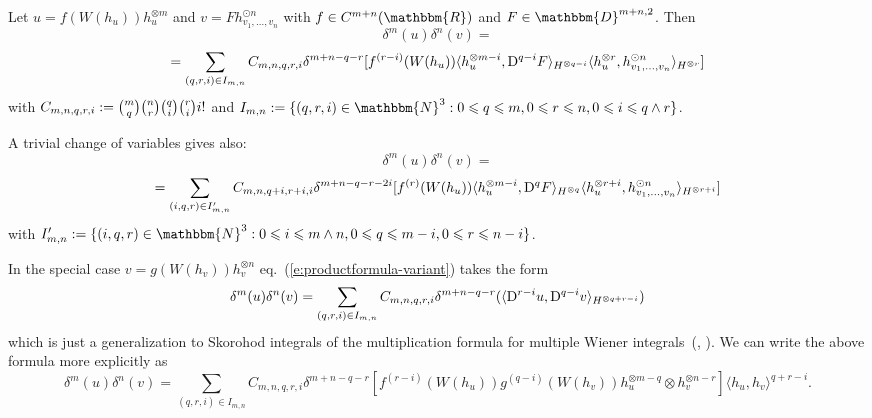 \begin{appendices}
\begin{lemma}
  Let $u = f (W (h_u)) h^{\otimes m}_u$ and $v = Fh^{\odot n}_{v_1, \ldots,
  v_n}$ with $f \in C^{m + n} (\mathbbm{R})$ and $F \in \mathbbm{D}^{m + n,
  2}$. Then
  \[ \delta^m (u) \delta^n (v) = \]
  \begin{equation}
    = \sum_{(q, r, i) \in I_{m, n}} C_{m, n, q, r, i} \delta^{m + n - q - r}
    [f^{(r - i)} (W (h_u)) \langle h_u^{\otimes m - i}, \mathrm{D}^{q - i} F
    \rangle_{H^{\otimes q - i}} \langle h^{\otimes r}_u, h^{\odot n}_{v_1,
    \ldots, v_n} \rangle_{H^{\otimes r}}] \label{e:productformula-variant}
  \end{equation}
  with $C_{m, n, q, r, i} := \binom{m}{q} \binom{n}{r} \binom{q}{i}
  \binom{r}{i} i!$ and $I_{m, n} \assign \{ (q, r, i) \in \mathbbm{N}^3 : 0
  \leqslant q \leqslant m, 0 \leqslant r \leqslant n, 0 \leqslant i \leqslant
  q \wedge r \}$.
  
  A trivial change of variables gives also:
  \[ \delta^m (u) \delta^n (v) = \]
  \begin{equation}
    = \sum_{(i, q, r) \in I'_{m, n}} C_{m, n, q + i, r + i, i} \delta^{m + n -
    q - r - 2 i} [f^{(r)} (W (h_u)) \langle h_u^{\otimes m - i}, \mathrm{D}^q F
    \rangle_{H^{\otimes q}} \langle h^{\otimes r + i}_u, h^{\odot n}_{v_1,
    \ldots, v_n} \rangle_{H^{\otimes r + i}}]
  \end{equation}
  with $I'_{m, n} \assign \{ (i, q, r) \in \mathbbm{N}^3 : 0 \leqslant i
  \leqslant m \wedge n, 0 \leqslant q \leqslant m - i, 0 \leqslant r \leqslant
  n - i \}$.
\end{lemma}

\begin{remark}
  \label{r:producformula-easier}In the special case $v = g (W (h_v))
  h^{\otimes n}_v$ eq.~(\ref{e:productformula-variant}) takes the form
  \begin{equation}
    \delta^m (u) \delta^n (v) = \sum_{(q, r, i) \in I_{m, n}} C_{m, n, q, r,
    i} \delta^{m + n - q - r} (\langle \mathrm{D}^{r - i} u, \mathrm{D}^{q - i} v
    \rangle_{H^{\otimes q + r - i}}) \label{e:productformula-easy}
  \end{equation}
  which is just a generalization to Skorohod integrals of the multiplication
  formula for multiple Wiener integrals~({\cite{shigekawa_derivatives_1980}},
  {\cite{ustunel_sophisticated_2014}}). We can write the above formula more
  explicitly as
  \[ \delta^m (u) \delta^n (v) = \sum_{(q, r, i) \in I_{m, n}} C_{m, n, q, r,
     i} \delta^{m + n - q - r} [f^{(r - i)} (W (h_u)) g^{(q - i)} (W (h_v))
     h_u^{\otimes m - q} \otimes h_v^{\otimes n - r}] \langle h_u, h_v
     \rangle^{q + r - i} . \]
\end{remark}


\end{appendices}
